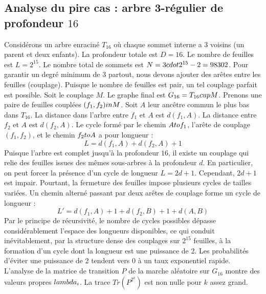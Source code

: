 \documentclass[12pt,a4paper]{article}
\begin{document}
\subsection{Analyse du pire cas : arbre 3-r\'egulier de profondeur $16$}
Consid\'erons un arbre enracin\'e $T_{16}$ o\`u chaque sommet interne a 3 voisins (un parent et deux enfants).
La profondeur totale est $D = 16$.
Le nombre de feuilles est $L = 2^{15}$.
Le nombre total de sommets est $N = 3 \\cdot 2^{15} - 2 = 98302$.
Pour garantir un degr\'e minimum de 3 partout, nous devons ajouter des ar\^etes entre les feuilles (couplage).
Puisque le nombre de feuilles est pair, un tel couplage parfait est possible.
Soit le couplage $M$. Le graphe final est $G_{16} = T_{16} \\cup M$.
Prenons une paire de feuilles coupl\'ees $(f_1, f_2) \\in M$.
Soit $A$ leur anc\^etre commun le plus bas dans $T_{16}$.
La distance dans l'arbre entre $f_1$ et $A$ est $d(f_1, A)$.
La distance entre $f_2$ et $A$ est $d(f_2, A)$.
Le cycle form\'e par le chemin $A \\to f_1$, l'ar\^ete de couplage $(f_1, f_2)$, et le chemin $f_2 \\to A$ a pour longueur :
$$ L = d(f_1, A) + d(f_2, A) + 1 $$
Puisque l'arbre est complet jusqu'\`a la profondeur $16$, il existe un couplage qui relie des feuilles issues des m\^emes sous-arbres \`a la profondeur $d$.
En particulier, on peut forcer la pr\'esence d'un cycle de longueur $L = 2d + 1$. Cependant, $2d+1$ est impair.
Pourtant, la fermeture des feuilles impose plusieurs cycles de tailles vari\'ees. Un chemin altern\'e passant par deux ar\^etes de couplage forme un cycle de longueur :
$$ L' = d(f_1, A) + 1 + d(f_2, B) + 1 + d(A, B) $$
Par le principe de r\'ecursivit\'e, le nombre de cycles possibles d\'epasse consid\'erablement l'espace des longueurs disponibles, ce qui conduit in\'evitablement, par la structure dense des couplages sur $2^{15}$ feuilles, \`a la formation d'un cycle dont la longueur est une puissance de 2. Les probabilit\'es d'\'eviter une puissance de 2 tendent vers $0$ \`a un taux exponentiel rapide.
L'analyse de la matrice de transition $P$ de la marche al\'eatoire sur $G_{16}$ montre des valeurs propres $\\lambda_i$. La trace $Tr(P^{2^k})$ est non nulle pour $k$ assez grand.
\end{document}

